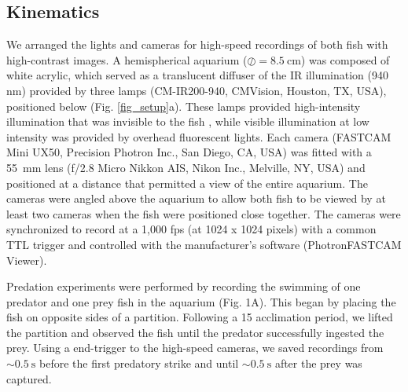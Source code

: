 \documentclass[]{rsos}%
\begin{document}
\subsection{Kinematics}
We arranged the lights and cameras for high-speed recordings of both fish with high-contrast images. 
A hemispherical aquarium ($\oslash = \SI{8.5}{\cm}$) was composed of white acrylic, which served as a translucent diffuser of the IR illumination (940 nm) provided by three lamps (CM-IR200-940, CMVision, Houston, TX, USA), positioned below (Fig. \ref{fig_setup}a). 
These lamps provided high-intensity illumination that was invisible to the fish \cite{Robinson:1993tu}, while visible illumination at low intensity was provided by overhead fluorescent lights.
Each camera (FASTCAM Mini UX50, Precision Photron Inc., San Diego, CA, USA) was fitted with a \SI{55}{\mm} lens (f/2.8 Micro Nikkon AIS, Nikon Inc., Melville, NY, USA) and positioned at a distance that permitted a view of the entire aquarium. 
The cameras were angled above the aquarium to allow both fish to be viewed by at least two cameras when the fish were positioned close together.
The cameras were synchronized to record at a 1,000 fps (at 1024 x 1024 pixels) with a common TTL trigger and controlled with the manufacturer's software (PhotronFASTCAM Viewer).

Predation experiments were performed by recording the swimming of one predator and one prey fish in the aquarium (Fig. 1A). 
This began by placing the fish on opposite sides of a partition.
Following a \SI{15}{\min} acclimation period, we lifted the partition and observed the fish until the predator successfully ingested the prey.
Using a end-trigger to the high-speed cameras, we saved recordings from $\sim \SI{0.5}{\s}$ before the first predatory strike and until $\sim \SI{0.5}{\s}$  after the prey was captured.
\end{document}
